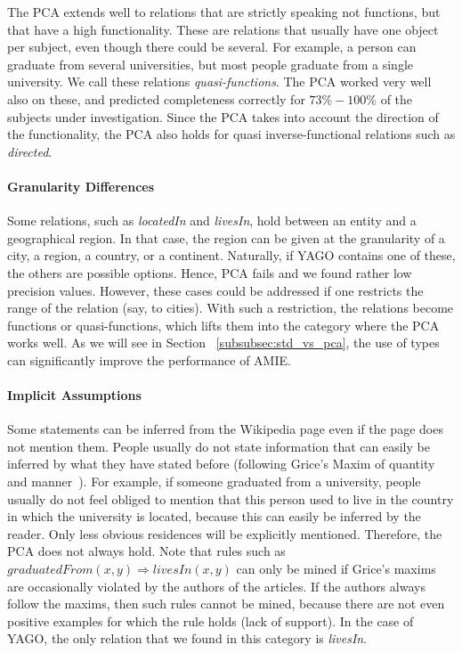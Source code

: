 The PCA extends well to relations that are strictly speaking not functions, but that have a high functionality.
These are relations that usually have one object per subject, even though there could be several.
For example, a person can graduate from several universities, but most people graduate from a single university. We call these relations \emph{quasi-functions}.
The PCA worked very well also on these, and predicted completeness correctly for $73\%-100\%$
of the subjects under investigation. Since the PCA takes into account the direction of the functionality, the PCA also holds for quasi inverse-functional relations such as \emph{directed}.

\paragraph{Granularity Differences} Some relations, such as \emph{locatedIn} and \emph{livesIn}, hold between an entity and a geographical region.
In that case, the region can be given at the granularity of a city, a region, a country, or a continent.
Naturally, if YAGO contains one of these, the others are possible options. Hence, PCA fails and we found rather low precision values.
However, these cases could be addressed if one restricts the range of the relation (say, to cities).
With such a restriction, the relations become functions or quasi-functions, which lifts them into the category where the PCA works well.
As we will see in Section ~\ref{subsubsec:std_vs_pca}, the use of types can significantly improve the performance of AMIE. 

\paragraph{Implicit Assumptions} Some statements can be inferred from the Wikipedia page even if the page does not mention them. %
People usually do not state information that can easily be inferred by what they have stated before
(following Grice's Maxim of quantity and manner~\cite{grice}). %
For example, if someone graduated from a university, people usually do not feel obliged to mention that this person used to live in the country
 in which the university is located,
because this can easily be inferred by the reader. Only less obvious residences will be explicitly mentioned. Therefore, the PCA does not always hold.
Note that rules such as $graduatedFrom(x,y)\Rightarrow livesIn(x,y)$ can only be mined if Grice's maxims are occasionally violated by the authors of the articles.
If the authors always follow the maxims, then such rules cannot be mined, because there are not even positive examples for which the rule holds (lack of support).
In the case of YAGO, the only relation that we found in this category is \emph{livesIn}.


